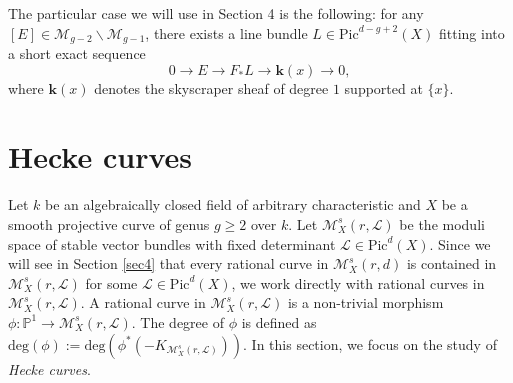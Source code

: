 \documentclass{kms-b}
\numberwithin{equation}{section}
\theoremstyle{plain}
\theoremstyle{definition}
\theoremstyle{remark}
\begin{document}
The particular case we will use in Section 4 is the following: for any $[E] \in \mathcal{M}_{g-2} \backslash \mathcal{M}_{g-1}$, there exists a line bundle $L\in \mathrm{Pic}^{d-g+2}(X)$ fitting into a short exact sequence
\begin{equation*}
    0 \to E \to F_*L \to \textbf{k}(x) \to 0,
\end{equation*}
where $\textbf{k}(x)$ denotes the skyscraper sheaf of degree $1$ supported at $\{x\}$.


\section{Hecke curves}\label{sec3}
Let $k$ be an algebraically closed field of arbitrary characteristic and $X$ be a smooth projective curve of genus $g \geqslant 2$  over $k$. Let $\mathcal{M}^s_X(r,\mathcal{L})$ be the moduli space of stable vector bundles with fixed determinant $\mathcal{L} \in \mathrm{Pic}^d(X)$. 
Since we will see in Section \ref{sec4} that every rational curve in $\mathcal{M}^s_X(r,d)$ is contained in $\mathcal{M}^s_X(r,\mathcal{L})$ for some $\mathcal{L}\in \mathrm{Pic}^d(X)$, we work directly with rational curves in $\mathcal{M}^s_X(r,\mathcal{L})$. A rational curve in $\mathcal{M}^s_X(r,\mathcal{L})$ is a non-trivial morphism $\phi:\mathbb{P}^1 \to \mathcal{M}^s_X(r,\mathcal{L})$. The degree of $\phi$ is defined as $\mathrm{deg}(\phi):=\mathrm{deg}(\phi^*(-K_{\mathcal{M}^s_X(r,\mathcal{L})}))$. In this section, we focus on the study of \emph{Hecke curves}. 
\end{document}
